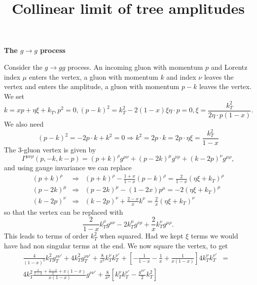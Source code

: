 \documentclass{letter}
\newcommand{\section}[1]{\medskip\bigskip

\noindent\textbf{\LARGE #1}}
\begin{document}
\title{Collinear limit of tree amplitudes}\author{}\maketitle

\section{The $g \rightarrow g$ process}

Consider the $g \rightarrow g g$ process. An incoming gluon with momentum $p$
and Lorentz index $\mu$ enters the vertex, a gluon with momentum $k$ and index
$\nu$ leaves the vertex and enters the amplitude, a gluon with momentum $p -
k$ leaves the vertex. We set
\begin{equation}
  k = x p + \eta \xi + k_T, p^2 = 0, (p - k)^2 = k_T^2 - 2 (1 - x) \xi \eta
  \cdot p = 0, \xi = \frac{k_T^2}{2 \eta \cdot p (1 - x)} .
\end{equation}
We also need
\[ (p - k)^2 = - 2 p \cdot k + k^2 = 0 \Longrightarrow k^2 = 2 p \cdot k = 2 p
   \cdot \eta \xi = \frac{k_T^2}{1 - x} \]
The 3-gluon vertex is given by
\begin{equation}
  \Gamma^{\mu \nu \rho} (p, - k, k - p) = (p + k)^{\rho} g^{\mu \nu} + (p - 2
  k)^{\mu} g^{\nu \rho} + (k - 2 p)^{\nu} g^{\mu \rho},
\end{equation}
and using gauge invariance we can replace
\begin{eqnarray}
  (p + k)^{\rho} & \Rightarrow & (p + k)^{\rho} - \frac{1 + x}{1 - x} (p -
  k)^{\rho} = \frac{2}{1 - x} (\eta \xi + k_T)^{\rho} \nonumber\\
  (p - 2 k)^{\mu} & \Rightarrow & (p - 2 k)^{\mu} - (1 - 2 x) p^{\mu} = - 2
  (\eta \xi + k_T)^{\mu} \nonumber\\
  (k - 2 p)^{\nu} & \Rightarrow & (k - 2 p)^{\nu} + \frac{2 - x}{x} k^{\nu} =
  \frac{2}{x} (\eta \xi + k_T)^{\nu} 
\end{eqnarray}
so that the vertex can be replaced with
\begin{equation}
  \frac{2}{1 - x} k_T^{\rho} g^{\mu \nu} - 2 k_T^{\mu} g^{\nu \rho} +
  \frac{2}{x} k_T^{\nu} g^{\mu \rho} .
\end{equation}
This leads to terms of order $k_T^2$ when squared. Had we kept $\xi$ terms we
would have had non singular terms at the end. We now square the vertex, to get
\begin{eqnarray}
  \frac{4}{(1 - x)^2} k_T^2 g^{\nu \nu'}_T + 4 k_T^2 g^{\nu \nu'}_T +
  \frac{8}{x^2} k_T^{\nu} k_T^{\nu'} + \left[ - \frac{1}{1 - x} - \frac{1}{x}
  + \frac{1}{x (1 - x)} \right] 4 k_T^{\nu} k_T^{\nu'} & = &  \nonumber\\
  4 k_T^2 \frac{\frac{x}{1 - x} + \frac{1 - x}{x} + x (1 - x)}{x (1 - x)}
  g^{\nu \nu'} + \frac{8}{x^2} \left[ k_T^{\nu} k_T^{\nu'} - \frac{g^{\nu
  \nu'}}{2} k_T^2 \right] &  & 
\end{eqnarray}
\end{document}
